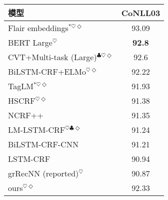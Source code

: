 \begin{table}[t]
	\vspace{0.5em}\centering\wuhao
	\begin{tabular}{lc}
		\toprule[1.5pt]
		模型 & CoNLL03 \\
		\midrule[1pt]
		Flair embeddings$^{*\heartsuit\Diamond}$ \cite{akbik-blythe-vollgraf:2018:C18-1} & 93.09 \\
		BERT Large$^\heartsuit$ \cite{DBLP:journals/corr/abs-1810-04805} & \textbf{92.8} \\
		CVT+Multi-task (Large)$^{\clubsuit\heartsuit\Diamond}$ \cite{clark-EtAl:2018:EMNLP} & 92.6 \\
		BiLSTM-CRF+ELMo$^{\heartsuit\Diamond}$ \cite{peters-EtAl:2018:N18-1} & 92.22 \\
		TagLM$^{*\heartsuit\Diamond}$ \cite{peters-EtAl:2017:Long}& 91.93\\
		HSCRF$^{\heartsuit\Diamond}$ \cite{ye-ling:2018:Short} & 91.38 \\
		NCRF++ \cite{yang-zhang:2018:Demos} & 91.35 \\
		LM-LSTM-CRF$^{\heartsuit\clubsuit\Diamond}$ \cite{Liu2018EmpowerSL} & 91.24 \\
		BiLSTM-CRF-CNN \cite{ma-hovy:2016:P16-1} & 91.21 \\
		LSTM-CRF \cite{lample-EtAl:2016:N16-1} & 90.94 \\
		grRecNN (reported)$^\heartsuit$ \cite{zhuo-EtAl:2016:P16-1} & 90.87 \\
		\midrule[0.5pt]
		ours$^{\heartsuit\Diamond}$ & 92.33 \\
		\bottomrule[1.5pt]
	\end{tabular}
\end{table}

